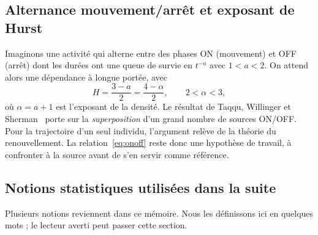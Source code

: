 \documentclass[11pt,a4paper]{article}
\renewcommand{\_}{\textunderscore\penalty0\hspace{0pt}}
\begin{document}
\subsection{Alternance mouvement/arrêt et exposant de Hurst}
\label{sec:onoff}

Imaginons une activité qui alterne entre des phases ON (mouvement) et OFF (arrêt) dont les
durées ont une queue de survie en $t^{-a}$ avec $1<a<2$. On attend alors une dépendance à
longue portée, avec
\begin{equation}
  H=\frac{3-a}{2}=\frac{4-\alpha}{2},\qquad 2<\alpha<3,
  \label{eq:onoff}
\end{equation}
où $\alpha=a+1$ est l'exposant de la densité. Le résultat de Taqqu, Willinger et
Sherman~\cite{taqqu1997} porte sur la \emph{superposition} d'un grand nombre de sources
ON/OFF. Pour la trajectoire d'un seul individu, l'argument relève de la théorie du
renouvellement. La relation~\eqref{eq:onoff} reste donc une hypothèse de travail, à
confronter à la source avant de s'en servir comme référence.

\subsection{Notions statistiques utilisées dans la suite}
\label{sec:notions}

Plusieurs notions reviennent dans ce mémoire. Nous les définissons ici en quelques mots ;
le lecteur averti peut passer cette section.
\end{document}
